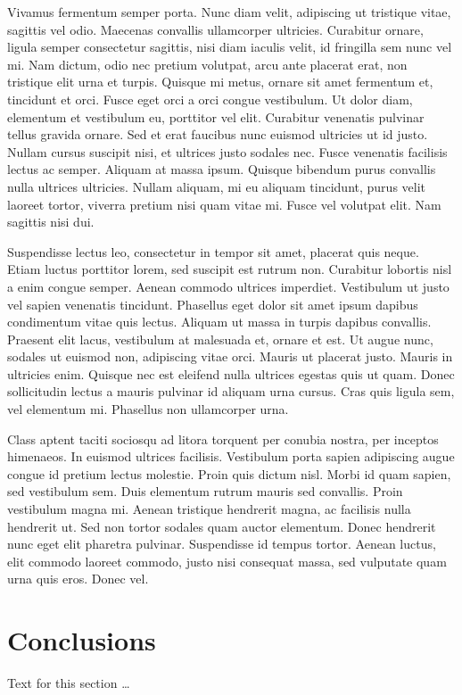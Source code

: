 \documentclass[10pt]{bmc_article}
\newenvironment{bmcformat}{\fussy\setboolean{publ}{true}}{\fussy}
\begin{document}
\begin{bmcformat}
Vivamus fermentum semper porta. Nunc diam velit, adipiscing ut
tristique vitae, sagittis vel odio. Maecenas convallis ullamcorper
ultricies. Curabitur ornare, ligula semper consectetur sagittis, nisi
diam iaculis velit, id fringilla sem nunc vel mi. Nam dictum, odio nec
pretium volutpat, arcu ante placerat erat, non tristique elit urna et
turpis. Quisque mi metus, ornare sit amet fermentum et, tincidunt et
orci. Fusce eget orci a orci congue vestibulum. Ut dolor diam,
elementum et vestibulum eu, porttitor vel elit. Curabitur venenatis
pulvinar tellus gravida ornare. Sed et erat faucibus nunc euismod
ultricies ut id justo. Nullam cursus suscipit nisi, et ultrices justo
sodales nec. Fusce venenatis facilisis lectus ac semper. Aliquam at
massa ipsum. Quisque bibendum purus convallis nulla ultrices
ultricies. Nullam aliquam, mi eu aliquam tincidunt, purus velit
laoreet tortor, viverra pretium nisi quam vitae mi. Fusce vel volutpat
elit. Nam sagittis nisi dui.


Suspendisse lectus leo, consectetur in tempor sit amet, placerat quis
neque. Etiam luctus porttitor lorem, sed suscipit est rutrum
non. Curabitur lobortis nisl a enim congue semper. Aenean commodo
ultrices imperdiet. Vestibulum ut justo vel sapien venenatis
tincidunt. Phasellus eget dolor sit amet ipsum dapibus condimentum
vitae quis lectus. Aliquam ut massa in turpis dapibus
convallis. Praesent elit lacus, vestibulum at malesuada et, ornare et
est. Ut augue nunc, sodales ut euismod non, adipiscing vitae
orci. Mauris ut placerat justo. Mauris in ultricies enim. Quisque nec
est eleifend nulla ultrices egestas quis ut quam. Donec sollicitudin
lectus a mauris pulvinar id aliquam urna cursus. Cras quis ligula sem,
vel elementum mi. Phasellus non ullamcorper urna.


Class aptent taciti sociosqu ad litora torquent per conubia nostra,
per inceptos himenaeos. In euismod ultrices facilisis. Vestibulum
porta sapien adipiscing augue congue id pretium lectus molestie. Proin
quis dictum nisl. Morbi id quam sapien, sed vestibulum sem. Duis
elementum rutrum mauris sed convallis. Proin vestibulum magna
mi. Aenean tristique hendrerit magna, ac facilisis nulla hendrerit
ut. Sed non tortor sodales quam auctor elementum. Donec hendrerit nunc
eget elit pharetra pulvinar. Suspendisse id tempus tortor. Aenean
luctus, elit commodo laoreet commodo, justo nisi consequat massa, sed
vulputate quam urna quis eros. Donec vel.


    

\section*{Conclusions}
  Text for this section \ldots



\end{bmcformat}
\end{document}
